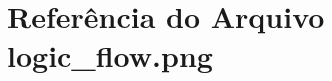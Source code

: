 \hypertarget{logic__flow_8png}{}\section{Referência do Arquivo logic\+\_\+flow.\+png}
\label{logic__flow_8png}
